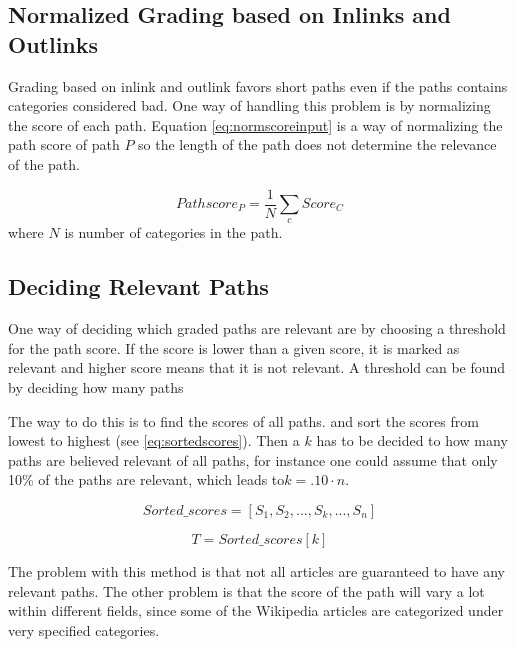 \subsection{Normalized Grading based on Inlinks and Outlinks}
Grading based on inlink and outlink favors short paths even if the paths contains categories considered bad. One way of handling this problem is by normalizing the score of each path. Equation \ref{eq:normscoreinput} is a way of normalizing the path score of path $P$ so the length of the path does not determine the relevance of the path. 


\begin{equation} \label{eq:normscoreinput}
Pathscore_{P} = \frac{1}{N} \sum_{c} Score_{C}
\end{equation}
where $N$ is number of categories in the path.


\subsection{Deciding Relevant Paths}
One way of deciding which graded paths are relevant are by choosing a threshold for the path score. If the score is lower than a given score, it is marked as relevant and higher score means that it is not relevant. A threshold can be found by deciding how many paths 

The way to do this is to find the scores of all paths. and sort the scores from lowest to highest (see \ref{eq:sortedscores}). Then a $k$ has to be decided to how many paths are believed relevant of all paths, for instance one could assume that only 10\% of the paths are relevant, which leads to$ k = .10 \cdot n$. 

\begin{equation} \label{eq:sortedscores}
Sorted\_scores = \left[ S_{1}, S_{2}, ... , S_{k}, ... , S_{n} \right]
\end{equation}



\begin{equation} \label{eq:threshold}
T = Sorted\_scores[k]
\end{equation}


The problem with this method is that not all articles are guaranteed to have any relevant paths. The other problem is that the score of the path will vary a lot within different fields, since some of the Wikipedia articles are categorized under very specified categories. 

